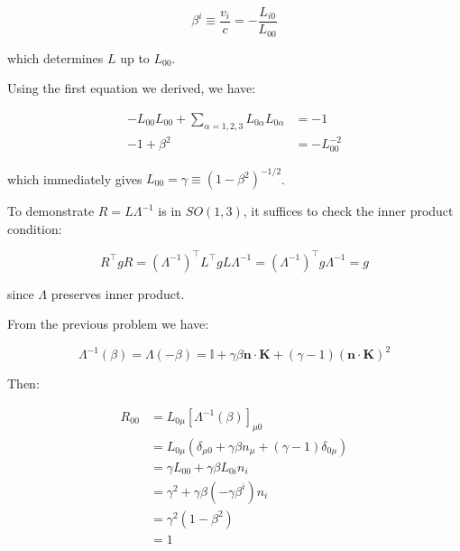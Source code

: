 \documentclass[12pt]{article}
\begin{document}
\begin{equation}
    \beta^{i} \equiv \frac{v_{i}}{c} = -\frac{L_{i0}}{L_{00}}
\end{equation}

which determines $L$ up to $L_{00}$.

Using the first equation we derived, we have:

\begin{equation}
    \begin{split}
        -L_{00}L_{00} + \sum_{\alpha = 1, 2, 3} L_{0\alpha}L_{0\alpha} &= -1 \\
        -1 + \beta^{2} &= -L_{00}^{-2}
    \end{split}
\end{equation}

which immediately gives $L_{00} = \gamma \equiv (1 - \beta^{2})^{-1/2}$.

To demonstrate $R = L\Lambda^{-1}$ is in $SO(1, 3)$, it suffices to check the inner product condition:

\begin{equation}
    R^{\intercal} g R = (\Lambda^{-1})^{\intercal} L^{\intercal} g L \Lambda^{-1} = (\Lambda^{-1})^{\intercal} g \Lambda^{-1} = g
\end{equation}

since $\Lambda$ preserves inner product.

From the previous problem we have:

\begin{equation}
    \Lambda^{-1}(\beta) = \Lambda(-\beta) = \mathbb{I} + \gamma \beta \mathbf{n} \cdot \mathbf{K} + (\gamma - 1) (\mathbf{n} \cdot \mathbf{K})^{2}
\end{equation}

Then:

\begin{equation}
    \begin{split}
        R_{00} &= L_{0\mu} [\Lambda^{-1}(\beta)]_{\mu 0} \\
        &= L_{0\mu} \left( \delta_{\mu 0} + \gamma \beta n_{\mu} + (\gamma - 1) \delta_{0 \mu} \right) \\
        &= \gamma L_{00} + \gamma \beta L_{0i} n_{i} \\
        &= \gamma^{2} + \gamma \beta (-\gamma \beta^{i}) n_{i} \\
        &= \gamma^{2} (1 - \beta^{2}) \\
        &= 1
    \end{split}
\end{equation}
\end{document}
